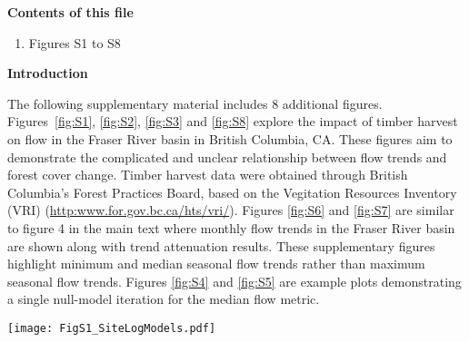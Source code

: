 \documentclass[draft,grl]{agutexSI}
\begin{document}
\begin{article}


\noindent\textbf{Contents of this file}

\begin{enumerate}
\item Figures S1 to S8
\end{enumerate}

\clearpage

\noindent\textbf{Introduction}

	The following supplementary material includes 8 additional figures. Figures~\ref{fig:S1}, \ref{fig:S2}, \ref{fig:S3} and \ref{fig:S8} explore the impact of timber harvest on flow in the Fraser River basin in British Columbia, CA. These figures aim to demonstrate the complicated and unclear relationship between flow trends and forest cover change. Timber harvest data were obtained through British Columbia's Forest Practices Board, based on the Vegitation Resources Inventory (VRI) (\url{http:www.for.gov.bc.ca/hts/vri/}). Figures \ref{fig:S6} and \ref{fig:S7} are similar to figure 4 in the main text where monthly flow trends in the Fraser River basin are shown along with trend attenuation results. These supplementary figures highlight minimum and median seasonal flow trends rather than maximum seasonal flow trends. Figures \ref{fig:S4} and \ref{fig:S5} are example plots demonstrating a single null-model iteration for the median flow metric.

\end{article}
\clearpage

\begin{sidewaysfigure}[h]
	\centering
	\noindent\texttt{[image: FigS1\_SiteLogModels.pdf]}
	\caption{Median annual flow plotted at an annual time step between 1970 and 2007 for 55 flow gauge stations within the Fraser River basin. Points are colored by the percent of the total watershed area harvested in the previous five years. Grey (blue: sites with no harvest) lines indicate the trend in flow over time using a linear model. Light grey around each trend line represents the 95\% confidence interval.}
	\label{fig:S1}
\end{sidewaysfigure}
\end{document}
